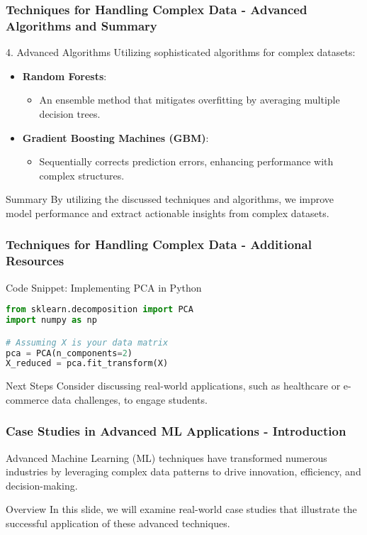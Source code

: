 \documentclass[aspectratio=169]{beamer}
\begin{document}
\begin{frame}[fragile]
    \frametitle{Techniques for Handling Complex Data - Advanced Algorithms and Summary}
    \begin{block}{4. Advanced Algorithms}
        Utilizing sophisticated algorithms for complex datasets:
        \begin{itemize}
            \item \textbf{Random Forests}: 
            \begin{itemize}
                \item An ensemble method that mitigates overfitting by averaging multiple decision trees.
            \end{itemize}
            \item \textbf{Gradient Boosting Machines (GBM)}: 
            \begin{itemize}
                \item Sequentially corrects prediction errors, enhancing performance with complex structures.
            \end{itemize}
        \end{itemize}
    \end{block}
    \begin{block}{Summary}
        By utilizing the discussed techniques and algorithms, we improve model performance and extract actionable insights from complex datasets.
    \end{block}
\end{frame}

\begin{frame}[fragile]
    \frametitle{Techniques for Handling Complex Data - Additional Resources}
    \begin{block}{Code Snippet: Implementing PCA in Python}
        \begin{lstlisting}[language=Python]
from sklearn.decomposition import PCA
import numpy as np

# Assuming X is your data matrix
pca = PCA(n_components=2)
X_reduced = pca.fit_transform(X)
        \end{lstlisting}
    \end{block}
    \begin{block}{Next Steps}
        Consider discussing real-world applications, such as healthcare or e-commerce data challenges, to engage students.
    \end{block}
\end{frame}

\begin{frame}[fragile]
    \frametitle{Case Studies in Advanced ML Applications - Introduction}
    Advanced Machine Learning (ML) techniques have transformed numerous industries by leveraging complex data patterns to drive innovation, efficiency, and decision-making. 

    \begin{block}{Overview}
        In this slide, we will examine real-world case studies that illustrate the successful application of these advanced techniques.
    \end{block}
\end{frame}
\end{document}
